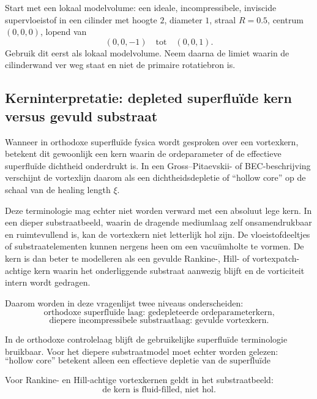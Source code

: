 \documentclass[11pt,a4paper]{article}
\begin{document}
Start met een lokaal modelvolume: een ideale, incompressibele, inviscide supervloeistof in een cilinder met hoogte \(2\), diameter \(1\), straal \(R=0.5\), centrum \((0,0,0)\), lopend van
\[
(0,0,-1)
\quad\text{tot}\quad
(0,0,1).
\]
Gebruik dit eerst als lokaal modelvolume. Neem daarna de limiet waarin de cilinderwand ver weg staat en niet de primaire rotatiebron is.
    
    \subsection*{Kerninterpretatie: depleted superfluïde kern versus gevuld substraat}
        
        Wanneer in orthodoxe superfluïde fysica wordt gesproken over een vortexkern, betekent dit gewoonlijk een kern waarin de ordeparameter of de effectieve superfluïde dichtheid onderdrukt is. In een Gross--Pitaevskii- of BEC-beschrijving verschijnt de vortexlijn daarom als een dichtheidsdepletie of ``hollow core'' op de schaal van de healing length \(\xi\).
        
        Deze terminologie mag echter niet worden verward met een absoluut lege kern. In een dieper substraatbeeld, waarin de dragende mediumlaag zelf onsamendrukbaar en ruimtevullend is, kan de vortexkern niet letterlijk hol zijn. De vloeistofdeeltjes of substraatelementen kunnen nergens heen om een vacuümholte te vormen. De kern is dan beter te modelleren als een gevulde Rankine-, Hill- of vortexpatch-achtige kern waarin het onderliggende substraat aanwezig blijft en de vorticiteit intern wordt gedragen.
        
        Daarom worden in deze vragenlijst twee niveaus onderscheiden:
        \[
            \text{orthodoxe superfluïde laag: gedepleteerde ordeparameterkern,}
        \]
        \[
            \text{diepere incompressibele substraatlaag: gevulde vortexkern.}
        \]
        
        In de orthodoxe controlelaag blijft de gebruikelijke superfluïde terminologie bruikbaar. Voor het diepere substraatmodel moet echter worden gelezen:
        \[
            \boxed{
                \text{``hollow core'' betekent alleen een effectieve depletie van de superfluïde ordeparameter, niet een lege kern van het onderliggende medium.}
            }
        \]
        
        Voor Rankine- en Hill-achtige vortexkernen geldt in het substraatbeeld:
        \[
            \boxed{
                \text{de kern is fluid-filled, niet hol.}
            }
        \]
        
\end{document}
